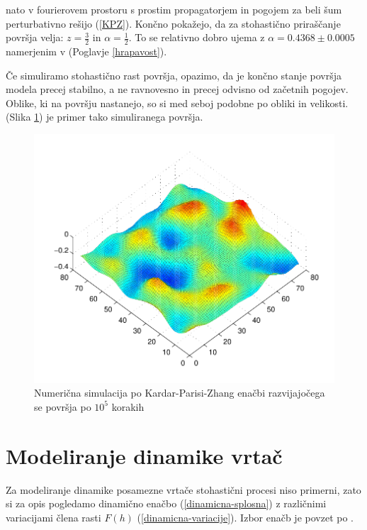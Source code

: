 \documentclass[a4paper, oneside, 12pt]{book}
\begin{document}
            \cite{kardar1986dynamic} nato v fourierovem prostoru s prostim propagatorjem in pogojem za beli šum perturbativno rešijo (\ref{KPZ}). Končno pokažejo, da za stohastično priraščanje površja velja: $z = \frac{3}{2}$ in $\alpha=\frac{1}{2}$. To se relativno dobro ujema z $\alpha=0.4368 \pm 0.0005$ namerjenim v (Poglavje \ref{hrapavost}).


            Če simuliramo stohastično rast površja, opazimo, da je končno stanje površja modela precej stabilno, a ne ravnovesno in precej odvisno od začetnih pogojev. Oblike, ki na površju nastanejo, so si med seboj podobne po obliki in velikosti. (Slika \ref{fig:KPZ-numericno}) je primer tako simuliranega površja.

            \begin{figure}[H]
              \begin{center}
                \includegraphics[width=13cm]{slike/KPZ-numericno}
              \end{center}
              \caption{Numerična simulacija po Kardar-Parisi-Zhang enačbi razvijajočega se površja po $10^5$ korakih}
              \label{fig:KPZ-numericno}
            \end{figure}


            \section{Modeliranje dinamike vrtač}

            Za modeliranje dinamike posamezne vrtače stohastični procesi niso primerni, zato si za opis pogledamo dinamično enačbo (\ref{dinamicna-splosna}) z različnimi variacijami člena rasti $F(h)$ (\ref{dinamicna-variacije}). Izbor enačb je povzet po \cite{kandler2010population}.
\end{document}
